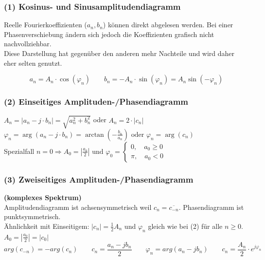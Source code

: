 \subsubsection{(1) Kosinus- und Sinusamplitudendiagramm} 
Reelle Fourierkoeffizienten ($a_n, b_n$) können direkt abgelesen werden. 
Bei einer Phasenverschiebung ändern sich jedoch die Koeffizienten grafisch nicht nachvollziehbar. \\
Diese Darstellung hat gegenüber den anderen mehr Nachteile und wird daher eher selten genutzt.

$$a_n = A_n \cdot \cos(\varphi_n) \qquad b_n = -A_n \cdot \sin(\varphi_n) = A_n \sin(-\varphi_n)$$

\begin{multicols}{2}
	\subsubsection{(2) Einseitiges Amplituden-/Phasendiagramm} 
	$A_n = |a_n - j \cdot b_n| = \sqrt{a_n^2 + b_n^2}$ oder $A_n = 2 \cdot |c_n|$\\
	$\varphi_n = \arg(a_n - j \cdot b_n) = \arctan(-\frac{b_n}{a_n}) \text{ oder } \varphi_n = \arg(c_n) $ \\
	Spezialfall $n=0 \Rightarrow A_0 = |\frac{a_0}{2}| \text{ und } \varphi_0 = \left\{
	\begin{array}{l} 
	0, \quad a_0 \geq 0\\
	\pi, \quad a_0 < 0  
	\end{array}
	\right. $\\
	\vfill\null
	\columnbreak
	\subsubsection{(3) Zweiseitiges Amplituden-/Phasendiagramm}
	\textbf{(komplexes Spektrum)}\\ 
	Amplitudendiagramm ist achsensymmetrisch weil $ c_n=\overline{c_{-n}} $. Phasendiagramm ist punktsymmetrisch. \\
	Ähnlichkeit mit Einseitigem: $|c_n| = \frac{1}{2}A_n $ und $\varphi_n$ gleich wie bei (2) für alle $ n \geq 0$.\\
	$A_0 = |\frac{a_0}{2}| = |c_0| $
	$$arg(c_{-n}) = -arg(c_n) \qquad c_n = \frac{a_n - jb_n}{2} \qquad \varphi_n = arg(a_n - jb_n) \qquad c_n = \frac{A_n}{2} \cdot e^{j\varphi_n}$$
\end{multicols}

